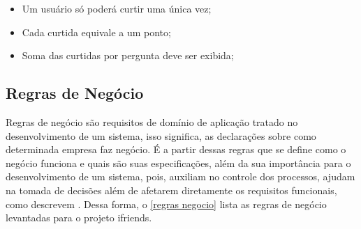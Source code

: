 \begin{itemize}
\item Um usuário só poderá curtir uma única vez;
\item Cada curtida equivale a um ponto;
\item Soma das curtidas por pergunta deve ser exibida;
\end{itemize}


\subsection{Regras de Negócio}
Regras de negócio são requisitos de domínio de aplicação tratado no desenvolvimento de um sistema, isso significa, as declarações sobre como determinada empresa faz negócio. É a partir dessas regras que se define como o negócio funciona e quais são suas especificações, além da sua importância para o desenvolvimento de um sistema, pois, auxiliam no controle dos processos, ajudam na tomada de decisões além de afetarem diretamente os requisitos funcionais, como descrevem . Dessa forma, o \autoref{regras negocio} lista as regras de negócio levantadas para o projeto \gls{ifriends}.

